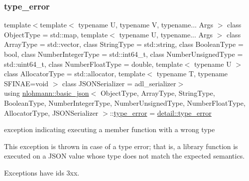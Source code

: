 \subsubsection{\texorpdfstring{type\+\_\+error}{type\_error}}
{\footnotesize\ttfamily template$<$template$<$ typename U, typename V, typename... Args $>$ class Object\+Type = std\+::map, template$<$ typename U, typename... Args $>$ class Array\+Type = std\+::vector, class String\+Type  = std\+::string, class Boolean\+Type  = bool, class Number\+Integer\+Type  = std\+::int64\+\_\+t, class Number\+Unsigned\+Type  = std\+::uint64\+\_\+t, class Number\+Float\+Type  = double, template$<$ typename U $>$ class Allocator\+Type = std\+::allocator, template$<$ typename T, typename S\+F\+I\+N\+A\+E=void $>$ class J\+S\+O\+N\+Serializer = adl\+\_\+serializer$>$ \\
using \mbox{\hyperlink{classnlohmann_1_1basic__json}{nlohmann\+::basic\+\_\+json}}$<$ Object\+Type, Array\+Type, String\+Type, Boolean\+Type, Number\+Integer\+Type, Number\+Unsigned\+Type, Number\+Float\+Type, Allocator\+Type, J\+S\+O\+N\+Serializer $>$\+::\mbox{\hyperlink{classnlohmann_1_1basic__json_a4010e8e268fefd86da773c10318f2902}{type\+\_\+error}} =  \mbox{\hyperlink{classnlohmann_1_1detail_1_1type__error}{detail\+::type\+\_\+error}}}



exception indicating executing a member function with a wrong type 

This exception is thrown in case of a type error; that is, a library function is executed on a J\+S\+ON value whose type does not match the expected semantics.

Exceptions have ids 3xx.

